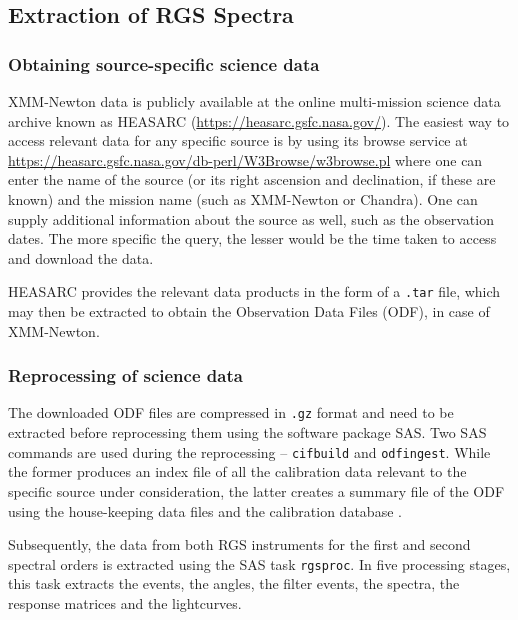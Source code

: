         \subsection{Extraction of RGS Spectra} \label{tool:rgs-files:extraction}
        
            \subsubsection{Obtaining source-specific science data} \label{tool:rgs-files:extraction:data}
                XMM-Newton data is publicly available at the online multi-mission science data archive known as HEASARC (\url{https://heasarc.gsfc.nasa.gov/}). The easiest way to access relevant data for any specific source is by using its browse service at \url{https://heasarc.gsfc.nasa.gov/db-perl/W3Browse/w3browse.pl} where one can enter the name of the source (or its right ascension and declination, if these are known) and the mission name (such as XMM-Newton or Chandra). One can supply additional information about the source as well, such as the observation dates. The more specific the query, the lesser would be the time taken to access and download the data.
                
                HEASARC provides the relevant data products in the form of a \texttt{.tar} file, which may then be extracted to obtain the Observation Data Files (ODF), in case of XMM-Newton.
            
            \subsubsection{Reprocessing of science data} \label{tool:rgs-files:extraction:reprocess}
                The downloaded ODF files are compressed in \texttt{.gz} format and need to be extracted before reprocessing them using the software package SAS. Two SAS commands are used during the reprocessing – \texttt{cifbuild} and \texttt{odfingest}. While the former produces an index file of all the calibration data relevant to the specific source under consideration, the latter creates a summary file of the ODF using the house-keeping data files and the calibration database \cite{de2019users}.
                
                Subsequently, the data from both RGS instruments for the first and second spectral orders is extracted using the SAS task \texttt{rgsproc}. In five processing stages, this task extracts the events, the angles, the filter events, the spectra, the response matrices and the lightcurves.
        
